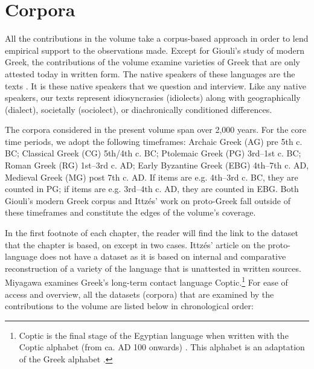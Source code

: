\documentclass[output=paper,colorlinks,citecolor=brown]{langscibook}
\begin{document}
\section{Corpora}
All the contributions in the volume take a corpus-based approach in order to lend empirical support to the observations made. Except for Giouli’s study of modern Greek, the contributions of the volume examine varieties of Greek that are only attested today in written form. The native speakers of these languages are the texts \citep[43]{fleischmanMethodologiesIdeologiesHistorical2000}. It is these native speakers that we question and interview. Like any native speakers, our texts represent idiosyncrasies (idiolects) along with geographically (dialect), societally (sociolect), or diachronically conditioned differences. 


The corpora considered in the present volume span over 2,000 years. For the core time periods, we adopt the following timeframes: Archaic Greek (AG) pre 5th c. BC; Classical Greek (CG) 5th/4th c. BC; Ptolemaic Greek (PG) 3rd–1st c. BC; Roman Greek (RG) 1st–3rd c. AD; Early Byzantine Greek (EBG) 4th–7th c. AD, Medieval Greek (MG) post 7th c. AD. If items are e.g. 4th–3rd c. BC, they are counted in PG; if items are e.g. 3rd–4th c. AD, they are counted in EBG. Both Giouli’s modern Greek corpus and Ittzés’ work on proto-Greek fall outside of these timeframes and constitute the edges of the volume’s coverage.


In the first footnote of each chapter, the reader will find the link to the dataset that the chapter is based, on except in two cases. Ittzés’ article on the proto-language does not have a dataset as it is based on internal and comparative reconstruction of a variety of the language that is unattested in written sources. Miyagawa examines Greek’s long-term contact language Coptic.\footnote{Coptic is the final stage of the Egyptian language when written with the Coptic alphabet (from ca. AD 100 onwards) \citep{quackHowCopticScript2017}. This alphabet is an adaptation of the Greek alphabet \citep{fendelMissingPieceJigsaw2021}.} For ease of access and overview, all the datasets (corpora) that are examined by the contributions to the volume are listed below in chronological order: 
\end{document}
